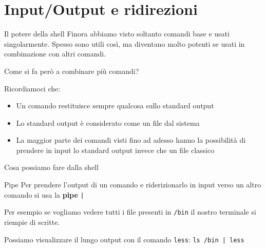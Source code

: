 \section{Input/Output e ridirezioni}
\begin{frame}{Il potere della shell}
  Finora abbiamo visto soltanto comandi base e usati singolarmente. Spesso sono
  utili così, ma diventano molto potenti se usati in
  combinazione con altri comandi.\bigskip

  Come si fa però a combinare più comandi? \bigskip 

  Ricordiamoci che:
  \begin{itemize}
    \item Un comando restituisce sempre qualcosa sullo standard output
    \item Lo standard output è considerato come un file dal sistema
    \item La maggior parte dei comandi visti fino ad adesso hanno la 
      possibilità di prendere in input lo standard output invece che un file 
      classico
  \end{itemize}
\end{frame}

\begin{frame}{Cosa possiamo fare dalla shell}
  \begin{figure}
  \end{figure}
\end{frame}

\begin{frame}{Pipe}
  Per prendere l'output di un comando e riderizionarlo in input verso un altro
  comando si usa la \textbf{pipe} \texttt{|}\bigskip

  Per esempio se vogliamo vedere tutti i file presenti in \texttt{/bin} il 
  nostro terminale si riempie di scritte.\bigskip

  Possiamo visualizzare il lungo output con il comando \texttt{less}: 
  \texttt{ls /bin | less}
\end{frame}

